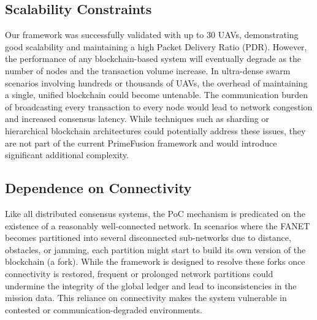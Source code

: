 \subsection{Scalability Constraints}
Our framework was successfully validated with up to 30 UAVs, demonstrating good scalability and maintaining a high Packet Delivery Ratio (PDR). However, the performance of any blockchain-based system will eventually degrade as the number of nodes and the transaction volume increase. In ultra-dense swarm scenarios involving hundreds or thousands of UAVs, the overhead of maintaining a single, unified blockchain could become untenable. The communication burden of broadcasting every transaction to every node would lead to network congestion and increased consensus latency. While techniques such as sharding or hierarchical blockchain architectures could potentially address these issues, they are not part of the current PrimeFusion framework and would introduce significant additional complexity.

\subsection{Dependence on Connectivity}
Like all distributed consensus systems, the PoC mechanism is predicated on the existence of a reasonably well-connected network. In scenarios where the FANET becomes partitioned into several disconnected sub-networks due to distance, obstacles, or jamming, each partition might start to build its own version of the blockchain (a fork). While the framework is designed to resolve these forks once connectivity is restored, frequent or prolonged network partitions could undermine the integrity of the global ledger and lead to inconsistencies in the mission data. This reliance on connectivity makes the system vulnerable in contested or communication-degraded environments.

